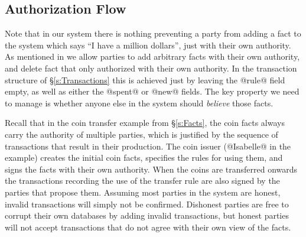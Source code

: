 \subsection{Authorization Flow}
Note that in our system there is nothing preventing a party from adding a fact to the system which says ``I have a million dollars'', just with their own authority. As mentioned in \label{s:Authority} we allow parties to add arbitrary facts with their own authority, and delete fact that only authorized with their own authority. In the transaction structure of \S\ref{s:Transactions} this is achieved just by leaving the @rule@ field empty, as well as either the @spent@ or @new@ fields. The key property we need to manage is whether anyone else in the system should \emph{believe} those facts.

Recall that in the coin transfer example from \S\ref{s:Facts}, the coin facts always carry the authority of multiple parties, which is justified by the sequence of transactions that result in their production. The coin issuer (@Isabelle@ in the example) creates the initial coin facts, specifies the rules for using them, and signs the facts with their own authority. When the coins are transferred onwards the transactions recording the use of the transfer rule are also signed by the parties that propose them. Assuming most parties in the system are honest, invalid transactions will simply not be confirmed. Dishonest parties are free to corrupt their own databases by adding invalid transactions, but honest parties will not accept transactions that do not agree with their own view of the facts.


